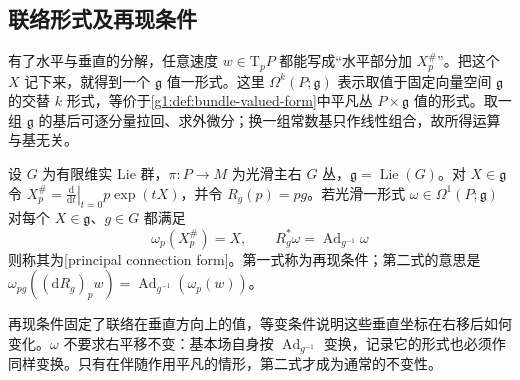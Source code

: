 \subsection{联络形式及再现条件}
\label{g1:subsec:1802:02}

有了水平与垂直的分解，任意速度 \(w\in \mathrm{T}_pP\) 都能写成“水平部分加 \(X_p^\#\)”。把这个 \(X\) 记下来，就得到一个 \(\mathfrak g\) 值一形式。这里 \(\Omega^k(P;\mathfrak g)\) 表示取值于固定向量空间 \(\mathfrak g\) 的交替 \(k\) 形式，等价于\cref{g1:def:bundle-valued-form}中平凡丛 \(P\times\mathfrak g\) 值的形式。取一组 \(\mathfrak g\) 的基后可逐分量拉回、求外微分；换一组常数基只作线性组合，故所得运算与基无关。

\begin{definition}\label{g1:def:principal-connection-form}
	设 \(G\) 为有限维实 Lie 群，\(\pi:P\to M\) 为光滑主右 \(G\) 丛，\(\mathfrak g=\operatorname{Lie}(G)\)。对 \(X\in\mathfrak g\) 令 \(X_p^\#=\left.\frac{\mathrm{d}}{\mathrm{d}t}\right|_{t=0}p\exp(tX)\)，并令 \(R_g(p)=pg\)。若光滑一形式 \(\omega\in\Omega^1(P;\mathfrak g)\) 对每个 \(X\in\mathfrak g\)、\(g\in G\) 都满足
	\begin{equation}\label{g1:eq:principal-connection-axioms}
		\omega_p(X_p^\#)=X,\qquad
		R_g^*\omega=\operatorname{Ad}_{g^{-1}}\omega
	\end{equation}
	则称其为[principal connection form]。第一式称为再现条件；第二式的意思是 \(\omega_{pg}((\mathrm{d}R_g)_pw)=\operatorname{Ad}_{g^{-1}}(\omega_p(w))\)。
\end{definition}

再现条件固定了联络在垂直方向上的值，等变条件说明这些垂直坐标在右移后如何变化。\(\omega\) 不要求右平移不变：基本场自身按 \(\operatorname{Ad}_{g^{-1}}\) 变换，记录它的形式也必须作同样变换。只有在伴随作用平凡的情形，第二式才成为通常的不变性。

